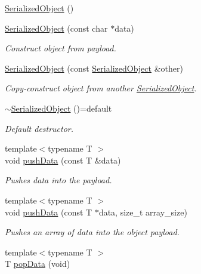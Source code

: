 \begin{DoxyCompactItemize}
\item 
\mbox{\hyperlink{classbas_1_1SerializedObject_a5b7956e31d74e4fe3f8e2c2c84da2001}{Serialized\+Object}} ()
\item 
\mbox{\hyperlink{classbas_1_1SerializedObject_aab03d4343a574ba80590a453ee403f40}{Serialized\+Object}} (const char $\ast$data)
\begin{DoxyCompactList}\small\item\em Construct object from payload. \end{DoxyCompactList}\item 
\mbox{\hyperlink{classbas_1_1SerializedObject_a9cd54ce67847bd339b01409ff32e0305}{Serialized\+Object}} (const \mbox{\hyperlink{classbas_1_1SerializedObject}{Serialized\+Object}} \&other)
\begin{DoxyCompactList}\small\item\em Copy-\/construct object from another \mbox{\hyperlink{classbas_1_1SerializedObject}{Serialized\+Object}}. \end{DoxyCompactList}\item 
\mbox{\hyperlink{classbas_1_1SerializedObject_a0cc782ee2adf54d1811c927ed898be9e}{$\sim$\+Serialized\+Object}} ()=default
\begin{DoxyCompactList}\small\item\em Default destructor. \end{DoxyCompactList}\item 
{\footnotesize template$<$typename T $>$ }\\void \mbox{\hyperlink{classbas_1_1SerializedObject_ae6d94b4b6c3d77dad3aab140ea6f7ca1}{push\+Data}} (const T \&data)
\begin{DoxyCompactList}\small\item\em Pushes data into the payload. \end{DoxyCompactList}\item 
{\footnotesize template$<$typename T $>$ }\\void \mbox{\hyperlink{classbas_1_1SerializedObject_acbf7e1dab49ddc312acf6bbde398a5be}{push\+Data}} (const T $\ast$data, size\+\_\+t array\+\_\+size)
\begin{DoxyCompactList}\small\item\em Pushes an array of data into the object payload. \end{DoxyCompactList}\item 
{\footnotesize template$<$typename T $>$ }\\T \mbox{\hyperlink{classbas_1_1SerializedObject_aad2a332aaecd0fba8eac2bf06b60d5df}{pop\+Data}} (void)

\end{DoxyCompactItemize}
